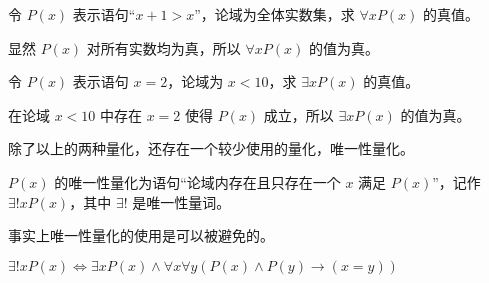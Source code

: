 \begin{collections}
    \begin{example}
        令 $P(x)$ 表示语句“$x + 1 > x$”，论域为全体实数集，求 $\forall x P(x)$ 的真值。
    \end{example}
    \begin{solution}
        显然 $P(x)$ 对所有实数均为真，所以 $\forall x P(x)$ 的值为真。
    \end{solution}

    \spare

    \begin{example}
        令 $P(x)$ 表示语句 $x = 2$，论域为 $x < 10$，求 $\exists x P(x)$ 的真值。
    \end{example}
    \begin{solution}
        在论域 $x < 10$ 中存在 $x = 2$ 使得 $P(x)$ 成立，所以 $\exists x P(x)$ 的值为真。
    \end{solution}
\end{collections}

除了以上的两种量化，还存在一个较少使用的量化，唯一性量化。
\begin{definition}
    $P(x)$ 的唯一性量化为语句“论域内存在且只存在一个 $x$ 满足 $P(x)$”，记作 $\exists ! x P(x)$，其中 $\exists !$ 是唯一性量词。
\end{definition}

事实上唯一性量化的使用是可以被避免的。
\begin{theorem}
    $\exists ! x P(x) \iff \exists x P(x) \land \forall x \forall y(P(x) \land P(y) \to (x = y))$
\end{theorem}